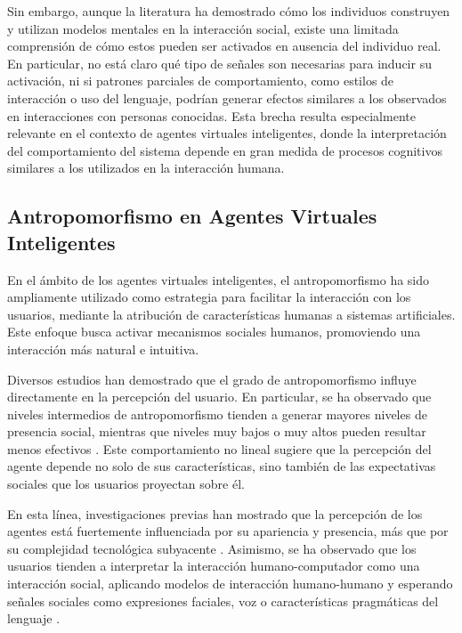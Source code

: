 \documentclass[12pt]{article}
\begin{document}
Sin embargo, aunque la literatura ha demostrado cómo los individuos construyen y utilizan modelos mentales en la interacción social, existe una limitada comprensión de cómo estos pueden ser activados en ausencia del individuo real. En particular, no está claro qué tipo de señales son necesarias para inducir su activación, ni si patrones parciales de comportamiento, como estilos de interacción o uso del lenguaje, podrían generar efectos similares a los observados en interacciones con personas conocidas. Esta brecha resulta especialmente relevante en el contexto de agentes virtuales inteligentes, donde la interpretación del comportamiento del sistema depende en gran medida de procesos cognitivos similares a los utilizados en la interacción humana.



\subsection{Antropomorfismo en Agentes Virtuales Inteligentes}

En el ámbito de los agentes virtuales inteligentes, el antropomorfismo ha sido ampliamente utilizado como estrategia para facilitar la interacción con los usuarios, mediante la atribución de características humanas a sistemas artificiales. Este enfoque busca activar mecanismos sociales humanos, promoviendo una interacción más natural e intuitiva.

Diversos estudios han demostrado que el grado de antropomorfismo influye directamente en la percepción del usuario. En particular, se ha observado que niveles intermedios de antropomorfismo tienden a generar mayores niveles de presencia social, mientras que niveles muy bajos o muy altos pueden resultar menos efectivos \cite{nowak_effect_2003}. Este comportamiento no lineal sugiere que la percepción del agente depende no solo de sus características, sino también de las expectativas sociales que los usuarios proyectan sobre él.

En esta línea, investigaciones previas han mostrado que la percepción de los agentes está fuertemente influenciada por su apariencia y presencia, más que por su complejidad tecnológica subyacente \cite{baylor_promoting_2009}. Asimismo, se ha observado que los usuarios tienden a interpretar la interacción humano-computador como una interacción social, aplicando modelos de interacción humano-humano y esperando señales sociales como expresiones faciales, voz o características pragmáticas del lenguaje \cite{louwerse_social_2005}.
\end{document}
